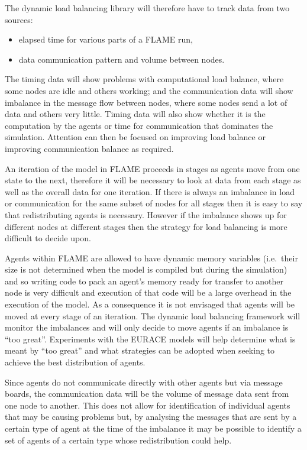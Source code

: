 The dynamic load balancing library will therefore have to track data from two sources:

\begin{itemize}
 \item elapsed time for various parts of a FLAME run,
 \item data communication pattern and volume between nodes.
\end{itemize}

The timing data will show problems with computational load balance, where some nodes are idle and others working; and the communication data will show imbalance in the message flow between nodes, where some nodes send a lot of data and others very little. Timing data will also show whether it is the computation by the agents or time for communication that dominates the simulation. Attention can then be focused on improving load balance or improving communication balance as required.

An iteration of the model in FLAME proceeds in stages as agents move from one state to the next, therefore it will be necessary to look at data from each stage as well as the overall data for one iteration. If there is always an imbalance in load or communication for the same subset of nodes for all stages then it is easy to say that redistributing agents is necessary. However if the imbalance shows up for different nodes at different stages then the strategy for load balancing is more difficult to decide upon. 

Agents within FLAME are allowed to have dynamic memory variables (i.e.\ their size is not determined when the model is compiled but during the simulation) and so writing code to pack an agent's memory ready for transfer to another node is very difficult and execution of that code will be a large overhead in the execution of the model. As a consequence it is not envisaged that agents will be moved at every stage of an iteration. The dynamic load balancing framework will monitor the imbalances and will only decide to move agents if an imbalance is ``too great''. Experiments with the EURACE models will help determine what is meant by ``too great'' and what strategies can be adopted when seeking to achieve the best distribution of agents.

Since agents do not communicate directly with other agents but via message boards, the communication data will be the volume of message data sent from one node to another. This does not allow for identification of individual agents that may be causing problems but, by analysing the messages that are sent by a certain type of agent at the time of the imbalance it may be possible to identify a set of agents of a certain type whose redistribution could help.

